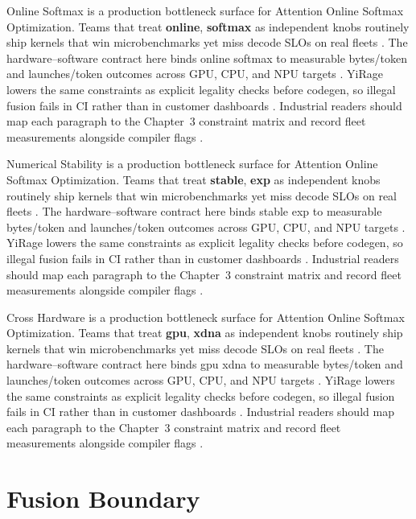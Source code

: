 Online Softmax is a production bottleneck surface for Attention Online Softmax Optimization. Teams that treat \textbf{online}, \textbf{softmax} as independent knobs routinely ship kernels that win microbenchmarks yet miss decode SLOs on real fleets \citep{patel2025llminference,nvidia2022hopper}. The hardware--software contract here binds online softmax to measurable bytes/token and launches/token outcomes across GPU, CPU, and NPU targets \citep{taxbreak2026,semianalysis2024tma}. YiRage lowers the same constraints as explicit legality checks before codegen, so illegal fusion fails in CI rather than in customer dashboards \citep{memoryfloor2026,amd2024xdna}. Industrial readers should map each paragraph to the Chapter~3 constraint matrix and record fleet measurements alongside compiler flags \citep{nvidia2022hopper,amd2024aie}.

Numerical Stability is a production bottleneck surface for Attention Online Softmax Optimization. Teams that treat \textbf{stable}, \textbf{exp} as independent knobs routinely ship kernels that win microbenchmarks yet miss decode SLOs on real fleets \citep{taxbreak2026,semianalysis2024tma}. The hardware--software contract here binds stable exp to measurable bytes/token and launches/token outcomes across GPU, CPU, and NPU targets \citep{memoryfloor2026,amd2024xdna}. YiRage lowers the same constraints as explicit legality checks before codegen, so illegal fusion fails in CI rather than in customer dashboards \citep{nvidia2022hopper,amd2024aie}. Industrial readers should map each paragraph to the Chapter~3 constraint matrix and record fleet measurements alongside compiler flags \citep{semianalysis2024tma,dlbook}.

Cross Hardware is a production bottleneck surface for Attention Online Softmax Optimization. Teams that treat \textbf{gpu}, \textbf{xdna} as independent knobs routinely ship kernels that win microbenchmarks yet miss decode SLOs on real fleets \citep{memoryfloor2026,amd2024xdna}. The hardware--software contract here binds gpu xdna to measurable bytes/token and launches/token outcomes across GPU, CPU, and NPU targets \citep{nvidia2022hopper,amd2024aie}. YiRage lowers the same constraints as explicit legality checks before codegen, so illegal fusion fails in CI rather than in customer dashboards \citep{semianalysis2024tma,dlbook}. Industrial readers should map each paragraph to the Chapter~3 constraint matrix and record fleet measurements alongside compiler flags \citep{amd2024xdna,dao2022flashattention}.

\section{Fusion Boundary}
\label{sec:fusion_boundary}

